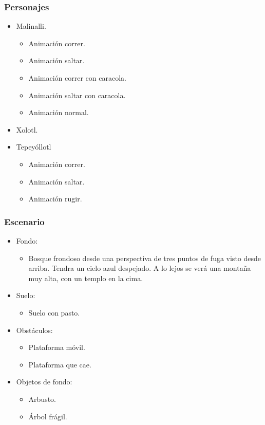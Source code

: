 \documentclass[11pt,letterpaper]{article}
\begin{document}
	\subsubsection{Personajes}
\begin{itemize}
	\item Malinalli.
		\begin{itemize}
			\item Animación correr.
			\item Animación saltar.
			\item Animación correr con caracola.
			\item Animación saltar con caracola.
			\item Animación normal.
		\end{itemize}
	\item Xolotl.
	\item Tepeyóllotl
		\begin{itemize}
			\item Animación correr.
			\item Animación saltar.
			\item Animación rugir.
		\end{itemize}
\end{itemize}
\subsubsection{Escenario}
\begin{itemize} 
	\item Fondo:
\begin{itemize}
	\item Bosque frondoso desde una perspectiva de tres puntos de fuga visto desde arriba. Tendra un cielo azul despejado. A lo lejos se verá una montaña muy alta, con un templo en la cima.
\end{itemize}
	\item Suelo:
		\begin{itemize}
			\item Suelo con pasto.
		\end{itemize}
	\item Obstáculos:
		\begin{itemize}
			\item Plataforma móvil.
			\item Plataforma que cae.
		\end{itemize}
	\item Objetos de fondo:
		\begin{itemize}
			\item Arbusto.
			\item Árbol frágil.
		\end{itemize}
\end{itemize}	
\end{document}
